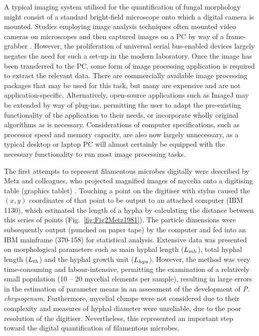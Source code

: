 A typical imaging system utilised for the quantification of fungal morphology might consist of a standard bright-field microscope onto which a digital camera is mounted. Studies employing image analysis techniques often mounted video cameras on microscopes and then captured images on a PC by way of a frame-grabber \cite{bartnicki-garcia2000,li2000}. However, the proliferation of universal serial bus-enabled devices largely negates the need for such a set-up in the modern laboratory. Once the image has been transferred to the PC, some form of image processing application is required to extract the relevant data. There are commercially available image processing packages that may be used for this task, but many are expensive and are not application-specific. Alternatively, open-source applications such as ImageJ \cite{imagej} may be extended by way of plug-ins, permitting the user to adapt the pre-existing functionality of the application to their needs, or incorporate wholly original algorithms as is necessary. Considerations of computer specifications, such as processor speed and memory capacity, are also now largely unnecessary, as a typical desktop or laptop PC will almost certainly be equipped with the necessary functionality to run most image processing tasks.

The first attempts to represent filamentous microbes digitally were described by Metz and colleagues, who projected magnified images of mycelia onto a digitising table (graphics tablet) \cite{metz1981}. Touching a point on the digitiser with stylus caused the $(x,y)$ coordinates of that point to be output to an attached computer (IBM 1130), which estimated the length of a hypha by calculating the distance between this series of points (Fig.~\ref{fig:Fig2Metz1981}). The particle dimensions were subsequently output (punched on paper tape) by the computer and fed into an IBM mainframe (370-158) for statistical analysis. Extensive data was presented on morphological parameters such as main hyphal length ($L_{mh}$), total hyphal length ($L_{th}$) and the hyphal growth unit ($L_{hgu}$). However, the method was very time-consuming and labour-intensive, permitting the examination of a relatively small population (10 -- 20 mycelial elements per sample), resulting in large errors in the estimation of parameter means in an assessment of the development of \emph{P. chrysogenum}. Furthermore, mycelial clumps were not considered due to their complexity and measures of hyphal diameter were unreliable, due to the poor resolution of the digitiser. Nevertheless, this represented an important step toward the digital quantification of filamentous microbes.

